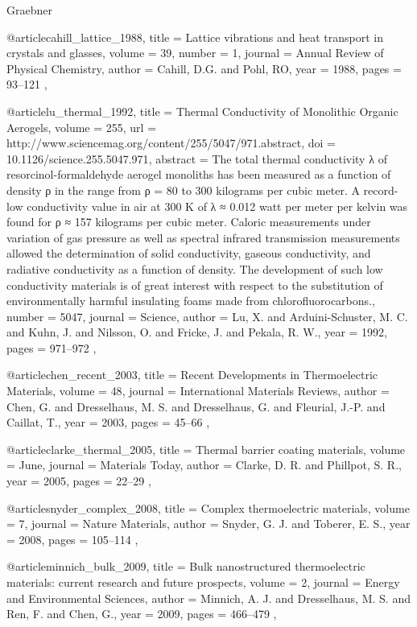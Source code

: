 \documentclass[12pt,twocolumn,iop]{/usr/share/texmf-texlive/tex/latex/iop/iopart}[/usr/share/texmf-texlive/tex/latex/iop/]
\begin{document}

\begin{thebibliography}{1}

 Graebner

@article{cahill_lattice_1988,
	title = {Lattice vibrations and heat transport in crystals and glasses},
	volume = {39},
	number = {1},
	journal = {Annual Review of Physical Chemistry},
	author = {Cahill, {D.G.} and Pohl, {RO}},
	year = {1988},
	pages = {93–121}
},

@article{lu_thermal_1992,
	title = {Thermal Conductivity of Monolithic Organic Aerogels},
	volume = {255},
	url = {http://www.sciencemag.org/content/255/5047/971.abstract},
	doi = {10.1126/science.255.5047.971},
	abstract = {The total thermal conductivity λ of resorcinol-formaldehyde aerogel monoliths has been measured as a function of density ρ in the range from ρ = 80 to 300 kilograms per cubic meter. A record-low conductivity value in air at 300 K of λ ≈ 0.012 watt per meter per kelvin was found for ρ ≈ 157 kilograms per cubic meter. Caloric measurements under variation of gas pressure as well as spectral infrared transmission measurements allowed the determination of solid conductivity, gaseous conductivity, and radiative conductivity as a function of density. The development of such low conductivity materials is of great interest with respect to the substitution of environmentally harmful insulating foams made from chlorofluorocarbons.},
	number = {5047},
	journal = {Science},
	author = {Lu, X. and Arduini-Schuster, M. C. and Kuhn, J. and Nilsson, O. and Fricke, J. and Pekala, R. W.},
	year = {1992},
	pages = {971--972}
},

@article{chen_recent_2003,
	title = {Recent Developments in Thermoelectric Materials},
	volume = {48},
	journal = {International Materials Reviews},
	author = {Chen, G. and Dresselhaus, M. S. and Dresselhaus, G. and Fleurial, J.-P. and Caillat, T.},
	year = {2003},
	pages = {45–66}
},

@article{clarke_thermal_2005,
	title = {Thermal barrier coating materials},
	volume = {June},
	journal = {Materials Today},
	author = {Clarke, D. R. and Phillpot, S. R.},
	year = {2005},
	pages = {22–29}
},

@article{snyder_complex_2008,
	title = {Complex thermoelectric materials},
	volume = {7},
	journal = {Nature Materials},
	author = {Snyder, G. J. and Toberer, E. S.},
	year = {2008},
	pages = {105--114}
},

@article{minnich_bulk_2009,
	title = {Bulk nanostructured thermoelectric materials: current research and future prospects},
	volume = {2},
	journal = {Energy and Environmental Sciences},
	author = {Minnich, A. J. and Dresselhaus, M. S. and Ren, F. and Chen, G.},
	year = {2009},
	pages = {466–479}
},


\end{thebibliography}
\end{document}
